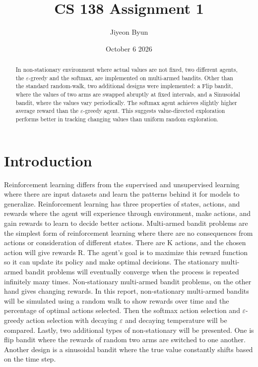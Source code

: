 \documentclass{article}
\title{CS 138 Assignment 1}
\author{Jiyeon Byun}
\date{October 6 2026}
\begin{document}
\maketitle

\begin{abstract}
    In non-stationary environment where actual values are not fixed, two
    different agents, the $\varepsilon$-greedy and the softmax, are implemented
    on multi-armed bandits. Other than the standard random-walk, two additional
    designs were implemented: a Flip bandit, where the values of two arms are
    swapped abruptly at fixed intervals, and a Sinusoidal bandit, where the
    values vary periodically. The softmax agent achieves slightly higher average
    reward than the $\varepsilon$-greedy agent. This suggests value-directed
    exploration performs better in tracking changing values than uniform random
    exploration.
\end{abstract}

\section{Introduction}
Reinforcement learning differs from the supervised and unsupervised learning
where there are input datasets and learn the patterns behind it for models to
generalize. Reinforcement learning has three properties of states, actions, and
rewards where the agent will experience through environment, make actions, and
gain rewards to learn to decide better actions. Multi-armed bandit problems are
the simplest form of reinforcement learning where there are no consequences from
actions or consideration of different states. There are K actions, and the
chosen action will give rewards R. The agent's goal is to maximize this reward
function so it can update its policy and make optimal decisions. The stationary
multi-armed bandit problems will eventually converge when the process is
repeated infinitely many times. Non-stationary multi-armed bandit problems, on
the other hand gives changing rewards. In this report, non-stationary
multi-armed bandits will be simulated using a random walk to show rewards over
time and the percentage of optimal actions selected. Then the softmax action
selection and $\varepsilon$-greedy action selection with decaying $\varepsilon$
and decaying temperature will be compared. Lastly, two additional types of
non-stationary will be presented. One is flip bandit where the rewards of random
two arms are switched to one another. Another design is a sinusoidal bandit
where the true value constantly shifts based on the time step.
\end{document}
